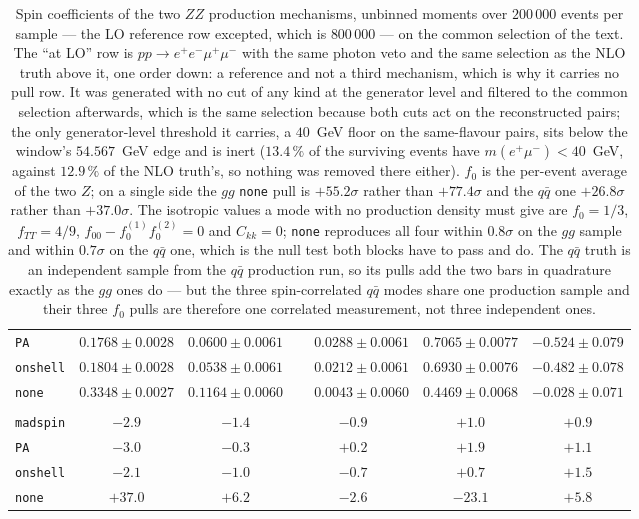 \documentclass[a4paper,11pt]{article}
\providecommand{\code}[1]{\texttt{#1}}
\providecommand{\ckk}{\ensuremath{C_{kk}}}              %
\begin{document}
\begin{table}[htbp]
\begin{tabular}{lccccc}
    \code{PA}          & $0.1768\pm0.0028$ & $0.0600\pm0.0061$ & $\phantom{-}0.0288\pm0.0061$ & $0.7065\pm0.0077$ & $-0.524\pm0.079$ \\
    \code{onshell}     & $0.1804\pm0.0028$ & $0.0538\pm0.0061$ & $\phantom{-}0.0212\pm0.0061$ & $0.6930\pm0.0076$ & $-0.482\pm0.078$ \\
    \code{none}        & $0.3348\pm0.0027$ & $0.1164\pm0.0060$ & $\phantom{-}0.0043\pm0.0060$ & $0.4469\pm0.0068$ & $-0.028\pm0.071$ \\
    \addlinespace[2pt]
    \multicolumn{6}{@{}l}{\emph{pull against the $q\bar q$ truth, in $\sigma$}}\\
    \code{madspin}     & $-2.9$ & $-1.4$ & $-0.9$ & $+1.0$ & $+0.9$ \\
    \code{PA}          & $-3.0$ & $-0.3$ & $+0.2$ & $+1.9$ & $+1.1$ \\
    \code{onshell}     & $-2.1$ & $-1.0$ & $-0.7$ & $+0.7$ & $+1.5$ \\
    \code{none}        & $+37.0$ & $+6.2$ & $-2.6$ & $-23.1$ & $+5.8$ \\
    \bottomrule
  \end{tabular}
  \caption{Spin coefficients of the two $ZZ$ production mechanisms, unbinned
    moments over $200\,000$ events per sample --- the LO reference row
    excepted, which is $800\,000$ --- on the common selection of the text.
    The ``at LO'' row is $pp\to e^+e^-\mu^+\mu^-$ with the same photon veto
    and the same selection as the NLO truth above it, one order down: a
    reference and not a third mechanism, which is why it carries no pull row.
    It was generated with no cut of any kind at the generator level and
    filtered to the common selection afterwards, which is the same selection
    because both cuts act on the reconstructed pairs; the only generator-level
    threshold it carries, a $40$~GeV floor on the same-flavour pairs, sits
    below the window's $54.567$~GeV edge and is inert ($13.4\,\%$ of the
    surviving events have $m(e^+\mu^-)<40$~GeV, against $12.9\,\%$ of the NLO
    truth's, so nothing was removed there either). $f_0$ is the per-event
    average of the two $Z$; on a single side the
    $gg$ \code{none} pull is $+55.2\sigma$ rather than $+77.4\sigma$ and the
    $q\bar q$ one $+26.8\sigma$ rather than $+37.0\sigma$. The isotropic values
    a mode with no production density must give are $f_0=1/3$, $f_{TT}=4/9$,
    $f_{00}-f_0^{(1)}f_0^{(2)}=0$ and $\ckk=0$; \code{none} reproduces all four
    within $0.8\sigma$ on the $gg$ sample and within $0.7\sigma$ on the
    $q\bar q$ one, which is the null test both blocks have to pass and do. The
    $q\bar q$ truth is an independent sample from the $q\bar q$ production run,
    so its pulls add the two bars in quadrature exactly as the $gg$ ones do ---
    but the three spin-correlated $q\bar q$ modes share one production sample
    and their three $f_0$ pulls are therefore one correlated measurement, not
    three independent ones.}
  \label{tab:spincoeff}
\end{table}
\end{document}
